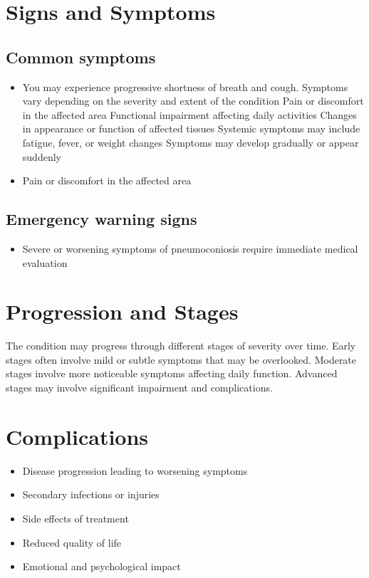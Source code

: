 \section{Signs and Symptoms}

\subsection{Common symptoms}
\begin{itemize}[noitemsep]
  \item You may experience progressive shortness of breath and cough. Symptoms vary depending on the severity and extent of the condition Pain or discomfort in the affected area Functional impairment affecting daily activities Changes in appearance or function of affected tissues Systemic symptoms may include fatigue, fever, or weight changes Symptoms may develop gradually or appear suddenly
  \item Pain or discomfort in the affected area
  \end{itemize}

\subsection{Emergency warning signs}
\begin{itemize}[noitemsep]
  \item Severe or worsening symptoms of pneumoconiosis require immediate medical evaluation
\end{itemize}
\section{Progression and Stages}
The condition may progress through different stages of severity over time. Early stages often involve mild or subtle symptoms that may be overlooked. Moderate stages involve more noticeable symptoms affecting daily function. Advanced stages may involve significant impairment and complications.
\section{Complications}
\begin{itemize}[noitemsep]
  \item Disease progression leading to worsening symptoms
  \item Secondary infections or injuries
  \item Side effects of treatment
  \item Reduced quality of life
  \item Emotional and psychological impact
\end{itemize}
